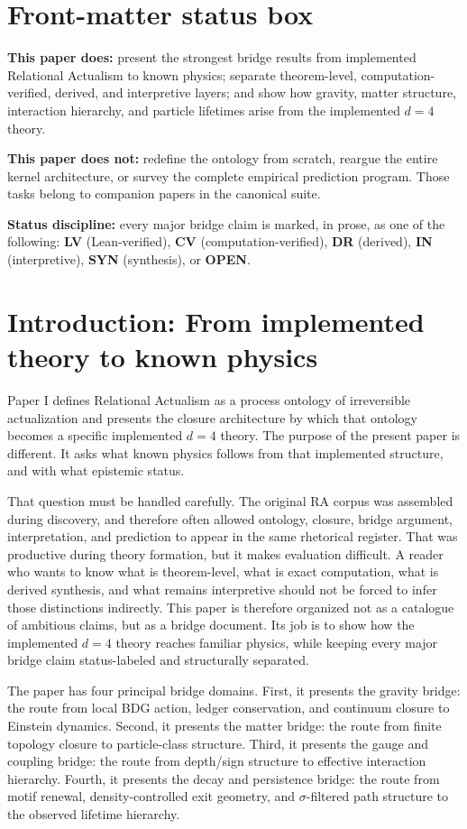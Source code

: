 \documentclass[11pt]{article}
\begin{document}
\section*{Front-matter status box}
\noindent\textbf{This paper does:} present the strongest bridge results from implemented Relational Actualism to known physics; separate theorem-level, computation-verified, derived, and interpretive layers; and show how gravity, matter structure, interaction hierarchy, and particle lifetimes arise from the implemented $d=4$ theory.

\noindent\textbf{This paper does not:} redefine the ontology from scratch, reargue the entire kernel architecture, or survey the complete empirical prediction program. Those tasks belong to companion papers in the canonical suite.

\noindent\textbf{Status discipline:} every major bridge claim is marked, in prose, as one of the following: \textbf{LV} (Lean-verified), \textbf{CV} (computation-verified), \textbf{DR} (derived), \textbf{IN} (interpretive), \textbf{SYN} (synthesis), or \textbf{OPEN}.

\section{Introduction: From implemented theory to known physics}
Paper I defines Relational Actualism as a process ontology of irreversible actualization and presents the closure architecture by which that ontology becomes a specific implemented $d=4$ theory. The purpose of the present paper is different. It asks what known physics follows from that implemented structure, and with what epistemic status.

That question must be handled carefully. The original RA corpus was assembled during discovery, and therefore often allowed ontology, closure, bridge argument, interpretation, and prediction to appear in the same rhetorical register. That was productive during theory formation, but it makes evaluation difficult. A reader who wants to know what is theorem-level, what is exact computation, what is derived synthesis, and what remains interpretive should not be forced to infer those distinctions indirectly. This paper is therefore organized not as a catalogue of ambitious claims, but as a bridge document. Its job is to show how the implemented $d=4$ theory reaches familiar physics, while keeping every major bridge claim status-labeled and structurally separated.

The paper has four principal bridge domains. First, it presents the gravity bridge: the route from local BDG action, ledger conservation, and continuum closure to Einstein dynamics. Second, it presents the matter bridge: the route from finite topology closure to particle-class structure. Third, it presents the gauge and coupling bridge: the route from depth/sign structure to effective interaction hierarchy. Fourth, it presents the decay and persistence bridge: the route from motif renewal, density-controlled exit geometry, and $\sigma$-filtered path structure to the observed lifetime hierarchy.
\end{document}
